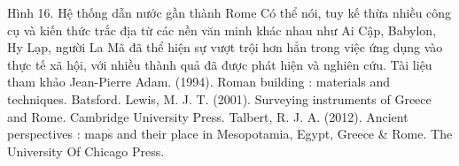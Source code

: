 \begin{multicols}{2}
	Hình 16. Hệ thống dẫn nước gần thành Rome
	Có thể nói, tuy kế thừa nhiều công cụ và kiến thức trắc địa từ các nền văn minh khác nhau như Ai Cập, Babylon, Hy Lạp,  người La Mã đã thể hiện sự vượt trội hơn hẳn trong việc ứng dụng vào thực tế xã hội, với nhiều thành quả đã được phát hiện và nghiên cứu.
	Tài liệu tham khảo
	Jean-Pierre Adam. (1994). Roman building : materials and techniques. Batsford.
	Lewis, M. J. T. (2001). Surveying instruments of Greece and Rome. Cambridge University Press.
	Talbert, R. J. A. (2012). Ancient perspectives : maps and their place in Mesopotamia, Egypt, Greece & Rome. The University Of Chicago Press.
	
	
	
\end{multicols}